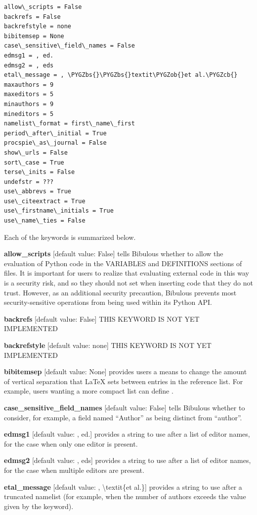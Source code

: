 \documentclass[letterpaper,10pt,english]{sphinxmanual}
\def\PYGZbs{\char`\\}
\def\PYGZob{\char`\{}
\def\PYGZcb{\char`\}}
\begin{document}
\begin{Verbatim}[commandchars=\\\{\}]
allow\_scripts = False
backrefs = False
backrefstyle = none
bibitemsep = None
case\_sensitive\_field\_names = False
edmsg1 = , ed.
edmsg2 = , eds
etal\_message = , \PYGZbs{}\PYGZbs{}textit\PYGZob{}et al.\PYGZcb{}
maxauthors = 9
maxeditors = 5
minauthors = 9
mineditors = 5
namelist\_format = first\_name\_first
period\_after\_initial = True
procspie\_as\_journal = False
show\_urls = False
sort\_case = True
terse\_inits = False
undefstr = ???
use\_abbrevs = True
use\_citeextract = True
use\_firstname\_initials = True
use\_name\_ties = False
\end{Verbatim}

Each of the keywords is summarized below.

\textbf{allow\_scripts} {[}default value: False{]} tells Bibulous whether to allow the evaluation of Python code in the VARIABLES and DEFINITIONS sections of  files. It is important for users to realize that evaluating external code in this way is a security risk, and so they should not set  when inserting code that they do not trust. However, as an additional security precaution, Bibulous prevents most security-sensitive operations from being used within its Python API.

\textbf{backrefs} {[}default value: False{]} THIS KEYWORD IS NOT YET IMPLEMENTED

\textbf{backrefstyle} {[}default value: none{]} THIS KEYWORD IS NOT YET IMPLEMENTED

\textbf{bibitemsep} {[}default value: None{]} provides users a means to change the amount of vertical separation that LaTeX sets between entries in the reference list. For example, users wanting a more compact list can define .

\textbf{case\_sensitive\_field\_names} {[}default value: False{]} tells Bibulous whether to consider, for example, a field named ``Author'' as being distinct from ``author''.

\textbf{edmsg1} {[}default value: , ed.{]} provides a string to use after a list of editor names, for the case when only one editor is present.

\textbf{edmsg2} {[}default value: , eds{]} provides a string to use after a list of editor names, for the case when multiple editors are present.

\textbf{etal\_message} {[}default value: , \textbackslash{}textit\{et al.\}{]} provides a string to use after a truncated namelist (for example, when the number of authors exceeds the value given by the  keyword).
\end{document}
